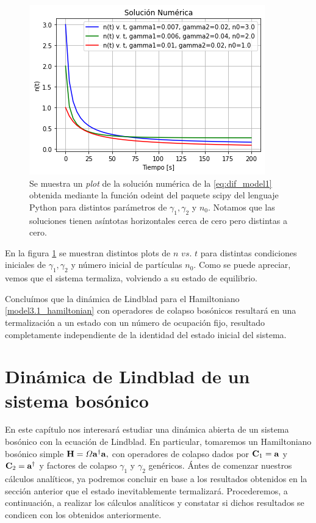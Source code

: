 \documentclass{report} %
\numberwithin{equation}{section}
\begin{document}
\begin{figure}
    \centering
    \includegraphics[scale=0.75]{figs/tdd_modelito1_sol_eq_diff_modificada.png}
    \caption{Se muestra un \textit{plot} de la solución numérica de la \eqref{eq:dif_model1} obtenida mediante la función odeint del paquete scipy del lenguaje Python para distintos parámetros de $\gamma_1,\gamma_2$ y $n_0$. Notamos que las soluciones tienen asíntotas horizontales cerca de cero pero distintas a cero.}
    \label{fig:tdd_modelito1_sol_eq_diff_odeint_multiples}
\end{figure}

En la figura \ref{fig:tdd_modelito1_sol_eq_diff_odeint_multiples} se muestran distintos plots de $n$ $vs$. $t$ para distintas condiciones iniciales de $\gamma_1, \gamma_2$ y número inicial de partículas $n_0$. Como se puede apreciar, vemos que el sistema termaliza, volviendo a su estado de equilibrio.

Concluímos que la dinámica de Lindblad para el Hamiltoniano \eqref{model3.1_hamiltonian} con operadores de colapso bosónicos resultará en una termalización a un estado con un número de ocupación fijo, resultado completamente independiente de la identidad del estado inicial del sistema.

\section{Din\'amica de Lindblad de un sistema bos\'onico}

En este capítulo nos interesará estudiar una dinámica abierta de un sistema bosónico con la ecuación de Lindblad. En particular, tomaremos un Hamiltoniano bosónico simple ${\bf H} = \Omega {\bf a}^{\dagger} {\bf a},$ con operadores de colapso dados por $\mathbf{C}_1 = {\bf a}$ y $\mathbf{C}_2 = {\bf a}^{\dagger}$ y factores de colapso $\gamma_1$ y $\gamma_2$ genéricos. Ántes de comenzar nuestros cálculos analíticos, ya podremos concluir en base a los resultados obtenidos en la sección anterior que el estado inevitablemente termalizará. Procederemos, a continuación, a realizar los cálculos analíticos y constatar si dichos resultados se condicen con los obtenidos anteriormente. 
\end{document}

